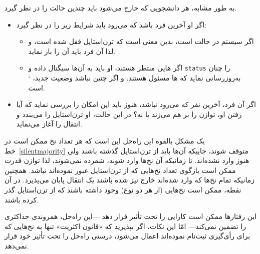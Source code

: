 \documentclass{book}
\newcommand{\clearemptydoublepage}{}%
\begin{document}
    به طور مشابه، هر دانشجویی که خارج می‌شود باید چندین حالت را در نظر گیرد. 

\begin{itemize}

\item
    اگر او آخرین فرد  باشد که می‌رود باید شرایط زیر را در نظر گیرد: 

    \begin{itemize}

    \item
        اگر سیستم در حالت  است، بدین معنی است که ترن‌استایل   قفل شده است، و لذا آن فرد باید آن را باز نماید. 

    \item 
    اگر هایی منتظر هستند، او باید به آن‌ها سیگنال داده و {\tt status}  را چنان به‌روزرسانی نماید که ها 
    مسئول هستند. و اگر چنین نباشد وضعیت جدید،       ` است. 

    \end{itemize}  

\item
    اگر آن فرد، آخرین نفر   که می‌رود نباشد، هنوز باید این امکان را بررسی نماید که آیا رفتن او، توازن را بر هم می‌زند یا نه؟ 
    در این حالت، او ترن‌استایل  را می‌بندد و انتقال را آغاز می‌نماید. 

\end{itemize}

    

    یک مشکل بالقوه این راه‌حل این است که هر تعداد نخ‌ ممکن است در خط~\ref{silentmajority} متوقف شوند، جاییکه آن‌ها 
    باید از ترن‌استایل گذشته باشند ولی هنوز وارد نشده‌اند. تا زمانیکه آن‌ نخ‌ها وارد شوند، شمرده نمی‌شوند، لذا توازن قدرت ممکن است 
    بازگوی تعداد نخ‌هایی که از ترن‌استایل عبور نموده‌اند نباشد. همچنین زمانیکه تمام نخ‌ها که وارد شده‌اند خارج نیز شده باشند یک انتقال 
    پایان می‌پذیرد. در آن نقطه، ممکن است نخ‌هایی (از هر دو نوع) وجود داشته باشند که از ترن‌استایل گذر کرده باشند. 
    
    این رفتارها ممکن است کارایی را تحت تأثیر قرار دهد ---این راه‌حل، همروندی حداکثری را تضمین نمی‌کند--- امّا این نکات،
    اگر بپذیرید که «قانون اکثریت»  تنها به نخ‌هایی که برای رأی‌گیری ثبت‌نام نموده‌اند اعمال می‌شود، 
    درستی راه‌حل را تحت تأثیر خود قرار نمی‌دهد. 
    

\clearemptydoublepage
\end{document}
